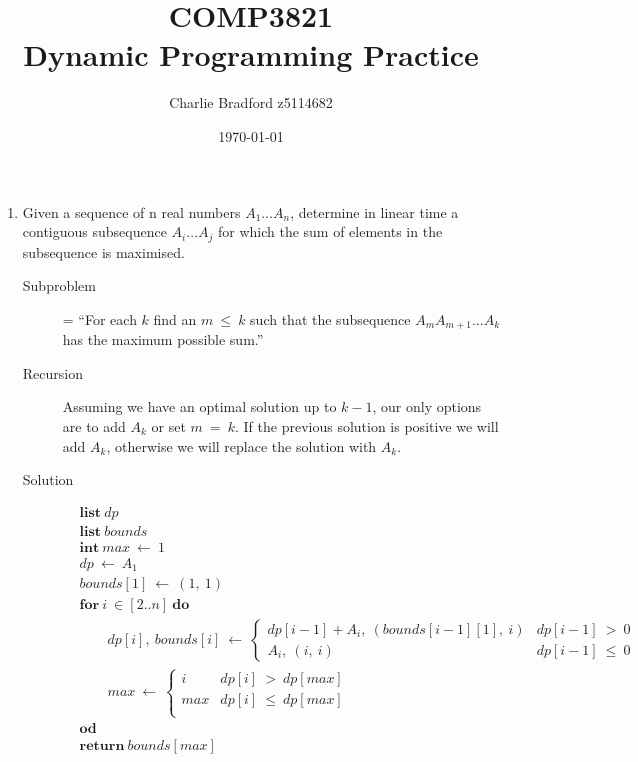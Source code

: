 \documentclass[a4paper]{article}
\title{%
		COMP3821 \\
\large Dynamic Programming Practice}
\author{Charlie Bradford z5114682}
\date{\today}
\begin{document}
\vspace{-2cm}
\maketitle

\begin{enumerate}
		\item Given a sequence of n real numbers $A_1 \dots A_n$, determine in linear time a contiguous subsequence $A_i\dots A_j$ for which the sum of elements in the subsequence is maximised.
				\begin{description}
						\item[Subproblem] = ``For each $k$ find an $m\ \leq\ k$ such that the subsequence $A_mA_{m+1}...A_k$ has the maximum possible sum.''

						\item[Recursion] Assuming we have an optimal solution up to $k-1$, our only options are to add $A_k$ or set $m\ =\ k$. If the previous solution is positive we will add $A_k$, otherwise we will replace the solution with $A_k$.
						\item[Solution] %
								\begin{align*}
										&\textbf{list}\ dp \\
										&\textbf{list}\ \textit{bounds} \\
										&\textbf{int}\ \textit{max}\ \gets\ 1\\
										&dp\ \gets\ A_1 \\
										&\textit{bounds}[1]\ \gets\ (1,\ 1) \\
										&\textbf{for}\ i\ \in [2..n]\ \textbf{do} \\
										&\qquad dp[i],\ \textit{bounds}[i]\ \gets\ 
										\begin{cases}
												dp[i-1] + A_i,\ (\textit{bounds}[i-1][1],\ i) &dp[i-1]\ >\ 0 \\
												A_i,\ (i,\ i) &dp[i-1]\ \leq\ 0
										\end{cases} \\
										&\qquad max\ \gets\ 
										\begin{cases}
												i & dp[i]\ >\ dp[max] \\
												max & dp[i]\ \leq\ dp[max]\\
										\end{cases} \\
										&\textbf{od} \\
										&\textbf{return}\ \textit{bounds}[max]
								\end{align*}

\end{description}
\end{enumerate}
\end{document}
